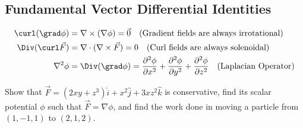 \subsection{Fundamental Vector Differential Identities}
\begin{align}
    \curl(\grad\phi) &= \nabla\times(\nabla\phi) = \vec{0} \quad (\text{Gradient fields are always irrotational}) \\
    \Div(\curl\vec{F}) &= \nabla\cdot(\nabla\times\vec{F}) = 0 \quad (\text{Curl fields are always solenoidal}) \\
    \nabla^2\phi &= \Div(\grad\phi) = \frac{\partial^2\phi}{\partial x^2} + \frac{\partial^2\phi}{\partial y^2} + \frac{\partial^2\phi}{\partial z^2} \quad (\text{Laplacian Operator})
\end{align}

\begin{example}
Show that $\vec{F} = (2xy + z^3)\hat{i} + x^2\hat{j} + 3xz^2\hat{k}$ is conservative, find its scalar potential $\phi$ such that $\vec{F} = \nabla\phi$, and find the work done in moving a particle from $(1,-1,1)$ to $(2,1,2)$.
\end{example}

